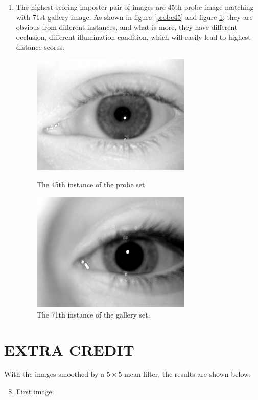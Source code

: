 \documentclass[a4paper]{article}
\begin{document}
\begin{spacing}{2.0}
\begin{enumerate}
	\item The highest scoring imposter pair of images are 45th probe image matching with 71st gallery image. As shown in figure \ref{probe45} and figure \ref{gallery71}, they are obvious from different instances, and what is more, they have different occlusion, different illumination condition, which will easily lead to highest distance scores.
	\begin{figure}[H]
	\begin{minipage}[t]{0.5\linewidth}
	\centering
	\includegraphics[width = 3in]{probe45.jpg}
	\caption{The 45th instance of the probe set.}
	\label{probe45}
	\end{minipage}
	\begin{minipage}[t]{0.5\linewidth}
	\centering
	\includegraphics[width = 3in]{gallery71.jpg}
	\caption{The 71th instance of the gallery set.}
	\label{gallery71}
	\end{minipage}
	\end{figure}
	
	\end{enumerate}



\section*{\huge\textbf{ EXTRA CREDIT}  }
	\normalsize  With the images smoothed by a $5\times 5$ mean filter, the results are shown below:
	\begin{enumerate}
	\setcounter{enumi}{7}
	\item 	First image:\\
	

\end{enumerate}
\end{spacing}
\end{document}
